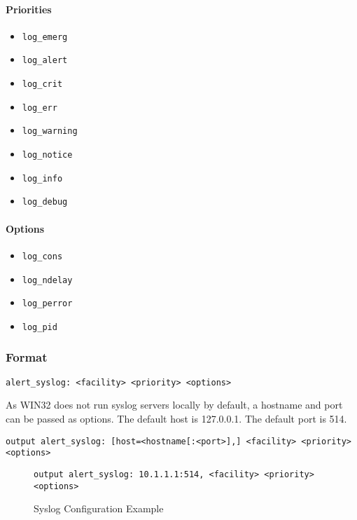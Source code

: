 \documentclass[english]{report}
\newenvironment{note}{
\samepage
    \vspace{10pt}{\textsf{
        {\hspace{7pt}\Huge{$\triangle$\hspace{-12.5pt}{\Large{$^!$}}}}\hspace{5pt}
        {\Large{NOTE}}
    }
    }
   \begin{center}
    \par\vspace{-17pt}

    \begin{lrbox}{\savepar}
    \begin{minipage}[r]{6in}
}
{
    \end{minipage}
    \end{lrbox}
    \fbox{
        \usebox{
            \savepar
	}
    }
    \par\vskip10pt
    \end{center}
}
\begin{document}
\paragraph{Priorities}

\begin{itemize}
\item \texttt{log\_emerg} 
\item \texttt{log\_alert}
\item \texttt{log\_crit}
\item \texttt{log\_err}
\item \texttt{log\_warning} 
\item \texttt{log\_notice}
\item \texttt{log\_info}
\item \texttt{log\_debug}
\end{itemize}

\paragraph{Options}

\begin{itemize}
\item \texttt{log\_cons} 
\item \texttt{log\_ndelay}
\item \texttt{log\_perror}
\item \texttt{log\_pid}
\end{itemize}

\subsubsection{Format}

\begin{verbatim}
alert_syslog: <facility> <priority> <options>
\end{verbatim}


\begin{note}
As WIN32 does not run syslog servers locally by default, a hostname and port
can be passed as options.  The default host is 127.0.0.1.  The default port is
514.
\end{note}

\begin{verbatim}
output alert_syslog: [host=<hostname[:<port>],] <facility> <priority> <options>
\end{verbatim}

\begin{figure}[!hbpt]
\begin{verbatim}
output alert_syslog: 10.1.1.1:514, <facility> <priority> <options>
\end{verbatim}

\caption{Syslog Configuration Example\label{syslog example}}
\end{figure}
\end{document}
